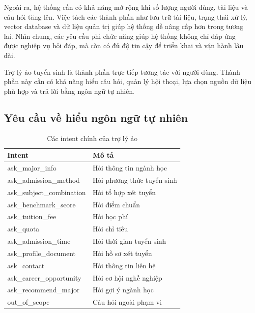 \documentclass[12pt,a4paper]{report}
\begin{document}
Ngoài ra, hệ thống cần có khả năng mở rộng khi số lượng người dùng, tài liệu và câu hỏi tăng lên. Việc tách các thành phần như lưu trữ tài liệu, trạng thái xử lý, vector database và dữ liệu quản trị giúp hệ thống dễ nâng cấp hơn trong tương lai. Nhìn chung, các yêu cầu phi chức năng giúp hệ thống không chỉ đáp ứng được nghiệp vụ hỏi đáp, mà còn có đủ độ tin cậy để triển khai và vận hành lâu dài.


Trợ lý ảo tuyển sinh là thành phần trực tiếp tương tác với người dùng. Thành phần này cần có khả năng hiểu câu hỏi, quản lý hội thoại, lựa chọn nguồn dữ liệu phù hợp và trả lời bằng ngôn ngữ tự nhiên.

\subsection{Yêu cầu về hiểu ngôn ngữ tự nhiên}
\begin{table}[H]
\centering
\caption{Các intent chính của trợ lý ảo}
\label{tab:intents_main}
\begin{tabular}{|p{4.2cm}|p{7.8cm}|}
\hline
\textbf{Intent} & \textbf{Mô tả} \\ \hline
ask\_major\_info & Hỏi thông tin ngành học \\ \hline
ask\_admission\_method & Hỏi phương thức tuyển sinh \\ \hline
ask\_subject\_combination & Hỏi tổ hợp xét tuyển \\ \hline
ask\_benchmark\_score & Hỏi điểm chuẩn \\ \hline
ask\_tuition\_fee & Hỏi học phí \\ \hline
ask\_quota & Hỏi chỉ tiêu \\ \hline
ask\_admission\_time & Hỏi thời gian tuyển sinh \\ \hline
ask\_profile\_document & Hỏi hồ sơ xét tuyển \\ \hline
ask\_contact & Hỏi thông tin liên hệ \\ \hline
ask\_career\_opportunity & Hỏi cơ hội nghề nghiệp \\ \hline
ask\_recommend\_major & Hỏi gợi ý ngành học \\ \hline
out\_of\_scope & Câu hỏi ngoài phạm vi \\ \hline
\end{tabular}
\end{table}
\end{document}
